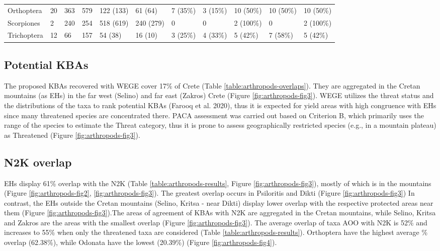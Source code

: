 \begin{sidewaystable}
\begin{tabular}{lllllllllll}
Orthoptera                   & 20   & 363   & 579         & 122 (133)         & 61 (64)                  & 7 (35\%)   & 3 (15\%)  & 10 (50\%) & 10 (50\%)  & 10 (50\%) \\
Scorpiones                   & 2    & 240   & 254         & 518 (619)         & 240 (279)                & 0          & 0         & 2 (100\%) & 0          & 2 (100\%) \\
Trichoptera                  & 12   & 66    & 157         & 54 (38)           & 16 (10)                  & 3 (25\%)   & 4 (33\%)  & 5 (42\%)  & 7 (58\%)   & 5 (42\%) 
\end{tabular}
\label{table:arthropods-results}
\end{sidewaystable}



\subsection{Potential KBAs}
    \label{subsec:potential-kbas}
    
    The proposed KBAs recovered with WEGE cover 17\% of Crete (Table \ref{table:arthropods-overlaps}). They are
aggregated in the Cretan mountains (as EHs) in the far west (Selino) and far
east (Zakros) Crete (Figure \ref{fig:arthropods-fig3}). WEGE utilizes the threat status and the
distributions of the taxa to rank potential KBAs (Farooq et al. 2020), thus it
is expected for yield areas with high congruence with EHs since many threatened
species are concentrated there. PACA assessment was carried out based on
Criterion B, which primarily uses the range of the species to estimate the
Threat category, thus it is prone to assess geographically restricted species
(e.g., in a mountain plateau) as Threatened (Figure \ref{fig:arthropods-fig3}).

    \subsection{N2K overlap}
    \label{subsec:n2k-overlap}

EHs display 61\% overlap with the N2K (Table \ref{table:arthropods-results}, Figure \ref{fig:arthropods-fig3}), mostly of which is
in the mountains (Figure \ref{fig:arthropods-fig2}, \ref{fig:arthropods-fig3}). The greatest overlap occurs in Psiloritis and
Dikti (Figure \ref{fig:arthropods-fig3}) In contrast, the EHs outside the Cretan mountains
(Selino, Kritsa - near Dikti) display lower overlap with the respective
protected areas near them (Figure \ref{fig:arthropods-fig3}).The areas of agreement of KBAs with N2K
are aggregated in the Cretan mountains, while Selino, Kritsa and Zakros are the
areas with the smallest overlap (Figure \ref{fig:arthropods-fig3}). The average overlap of taxa AOO
with N2K is 52\% and increases to 55\% when only the threatened taxa are
considered (Table \ref{table:arthropods-results}). Orthoptera have the highest average \% overlap (62.38\%),
while Odonata have the lowest (20.39\%) (Figure \ref{fig:arthropods-fig4}).
    

